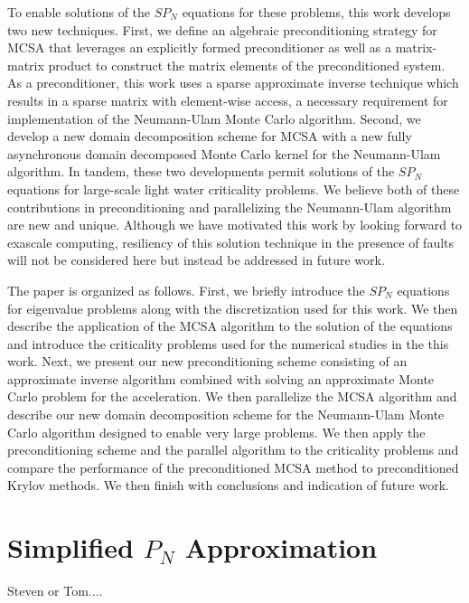 \documentclass[letterpaper,11pt]{article}
\begin{document}
To enable solutions of the $SP_N$ equations for these problems, this
work develops two new techniques. First, we define an algebraic
preconditioning strategy for MCSA that leverages an explicitly formed
preconditioner as well as a matrix-matrix product to construct the
matrix elements of the preconditioned system. As a preconditioner,
this work uses a sparse approximate inverse technique which results in
a sparse matrix with element-wise access, a necessary requirement for
implementation of the Neumann-Ulam Monte Carlo algorithm. Second, we
develop a new domain decomposition scheme for MCSA with a new fully
asynchronous domain decomposed Monte Carlo kernel for the Neumann-Ulam
algorithm. In tandem, these two developments permit solutions of the
$SP_N$ equations for large-scale light water criticality problems. We
believe both of these contributions in preconditioning and
parallelizing the Neumann-Ulam algorithm are new and unique. Although
we have motivated this work by looking forward to exascale computing,
resiliency of this solution technique in the presence of faults will
not be considered here but instead be addressed in future work.

The paper is organized as follows. First, we briefly introduce the
$SP_N$ equations for eigenvalue problems along with the discretization
used for this work. We then describe the application of the MCSA
algorithm to the solution of the equations and introduce the
criticality problems used for the numerical studies in the this
work. Next, we present our new preconditioning scheme consisting of an
approximate inverse algorithm combined with solving an approximate
Monte Carlo problem for the acceleration. We then parallelize the MCSA
algorithm and describe our new domain decomposition scheme for the
Neumann-Ulam Monte Carlo algorithm designed to enable very large
problems. We then apply the preconditioning scheme and the parallel
algorithm to the criticality problems and compare the performance of
the preconditioned MCSA method to preconditioned Krylov methods. We
then finish with conclusions and indication of future work.

\section{Simplified $P_N$ Approximation}

Steven or Tom....

\end{document}
